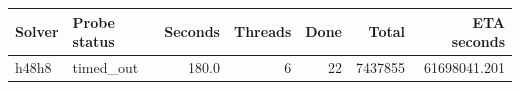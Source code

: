{\small
\begin{tabular}{llrrrrr}
\hline
Solver & Probe status & Seconds & Threads & Done & Total & ETA seconds \\
\hline
h48h8 & timed\_out & 180.0 & 6 & 22 & 7437855 & 61698041.201 \\
\hline
\end{tabular}
}
